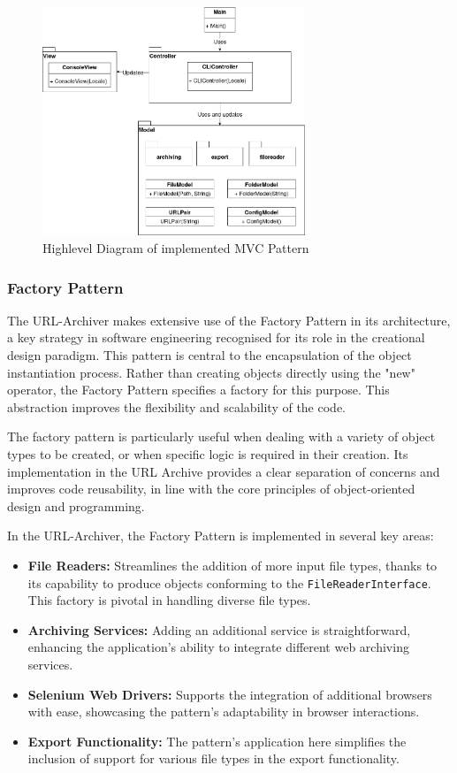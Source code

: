 \begin{figure}[h!]
    \center
    \includegraphics[width=0.7\textwidth]{diagrams/mvc_diagram-Highlevel_MVC.png}
    \caption{Highlevel Diagram of implemented MVC Pattern}
    \label{fig:MVC_Highlevel}
\end{figure}

\clearpage

\subsubsection{Factory Pattern}
The URL-Archiver makes extensive use of the Factory Pattern in its architecture, a key strategy in software engineering recognised for its role in the creational design paradigm. This pattern is central to the encapsulation of the object instantiation process. Rather than creating objects directly using the "new" operator, the Factory Pattern specifies a factory for this purpose. This abstraction improves the flexibility and scalability of the code.

The factory pattern is particularly useful when dealing with a variety of object types to be created, or when specific logic is required in their creation. Its implementation in the URL Archive provides a clear separation of concerns and improves code reusability, in line with the core principles of object-oriented design and programming.

In the URL-Archiver, the Factory Pattern is implemented in several key areas:

\begin{itemize}
	\item \textbf{File Readers:} Streamlines the addition of more input file types, thanks to its capability to produce objects conforming to the \texttt{FileReaderInterface}. This factory is pivotal in handling diverse file types.
	\item \textbf{Archiving Services:} Adding an additional service is straightforward, enhancing the application's ability to integrate different web archiving services.
	\item \textbf{Selenium Web Drivers:} Supports the integration of additional browsers with ease, showcasing the pattern’s adaptability in browser interactions.
	\item \textbf{Export Functionality:} The pattern's application here simplifies the inclusion of support for various file types in the export functionality.
\end{itemize}

